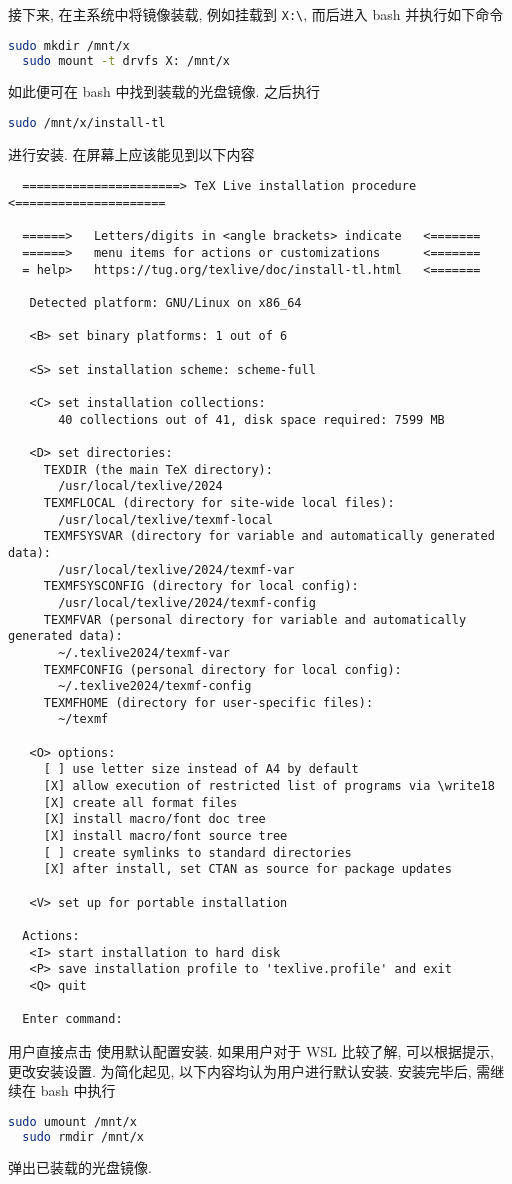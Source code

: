 接下来, 在主系统中将镜像装载,
例如挂载到 \texttt{X:\textbackslash},
而后进入 \textsf{bash} 并执行如下命令
\begin{lstlisting}[language = bash]
  sudo mkdir /mnt/x
  sudo mount -t drvfs X: /mnt/x
\end{lstlisting}
如此便可在 \textsf{bash} 中找到装载的光盘镜像.
之后执行
\begin{lstlisting}[language = bash]
  sudo /mnt/x/install-tl
\end{lstlisting}
进行安装.
在屏幕上应该能见到以下内容
\begin{lstlisting}
  ======================> TeX Live installation procedure <=====================
  
  ======>   Letters/digits in <angle brackets> indicate   <=======
  ======>   menu items for actions or customizations      <=======
  = help>   https://tug.org/texlive/doc/install-tl.html   <=======
  
   Detected platform: GNU/Linux on x86_64
   
   <B> set binary platforms: 1 out of 6
  
   <S> set installation scheme: scheme-full
  
   <C> set installation collections:
       40 collections out of 41, disk space required: 7599 MB
  
   <D> set directories:
     TEXDIR (the main TeX directory):
       /usr/local/texlive/2024
     TEXMFLOCAL (directory for site-wide local files):
       /usr/local/texlive/texmf-local
     TEXMFSYSVAR (directory for variable and automatically generated data):
       /usr/local/texlive/2024/texmf-var
     TEXMFSYSCONFIG (directory for local config):
       /usr/local/texlive/2024/texmf-config
     TEXMFVAR (personal directory for variable and automatically generated data):
       ~/.texlive2024/texmf-var
     TEXMFCONFIG (personal directory for local config):
       ~/.texlive2024/texmf-config
     TEXMFHOME (directory for user-specific files):
       ~/texmf
  
   <O> options:
     [ ] use letter size instead of A4 by default
     [X] allow execution of restricted list of programs via \write18
     [X] create all format files
     [X] install macro/font doc tree
     [X] install macro/font source tree
     [ ] create symlinks to standard directories
     [X] after install, set CTAN as source for package updates
  
   <V> set up for portable installation
  
  Actions:
   <I> start installation to hard disk
   <P> save installation profile to 'texlive.profile' and exit
   <Q> quit
  
  Enter command: 
\end{lstlisting}
用户直接点击  使用默认配置安装.
如果用户对于 WSL 比较了解, 可以根据提示, 更改安装设置.
为简化起见,
以下内容均认为用户进行默认安装.
安装完毕后, 需继续在 \textsf{bash} 中执行
\begin{lstlisting}[language = bash]
  sudo umount /mnt/x
  sudo rmdir /mnt/x
\end{lstlisting}
弹出已装载的光盘镜像.

